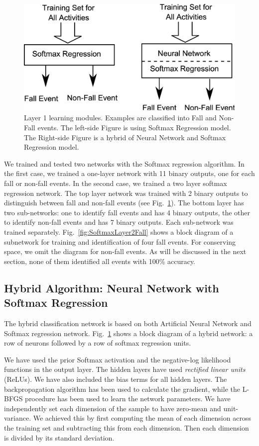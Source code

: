 \documentclass[]{IEEEtran}
\begin{document}
\begin{figure}[t]
	\centering
		\includegraphics[width=0.7\columnwidth]{figures/SoftmaxLayer1.eps}
	\caption{Layer 1 learning modules. Examples are classified into Fall
and Non-Fall events.  The left-side Figure is using Softmax Regression model.
The Right-side Figure is a hybrid of Neural Network and Softmax Regression
model.} \label{fig:SoftmaxLayer1}
\end{figure}

We trained and tested two networks with the Softmax regression algorithm. In
the first case, we trained a one-layer network with 11 binary outputs, one for
each fall or non-fall events. In the second case, we trained a two layer
softmax regression network. The top layer network was trained with 2 binary
outputs to distinguish between fall and non-fall events (see
Fig.~\ref{fig:SoftmaxLayer1}). The bottom layer has two sub-networks:  one to
identify fall events and has 4 binary outputs, the other to identify non-fall
events and has 7 binary outputs. Each sub-network was trained separately.
Fig.~\ref{fig:SoftmaxLayer2Fall} shows a block diagram of a subnetwork for
training and identification of four fall events. For conserving space, we omit
the diagram for non-fall events. As will be discussed in the next section, none
of them identified all events with 100\% accuracy.


\subsection{Hybrid Algorithm: Neural Network with Softmax Regression}
\label{sec:HybridAlgorithmNeuralNetworkAndSoftmaxRegreation}

The hybrid classification network is based on both Artificial Neural Network
and Softmax regression network. Fig.~\ref{fig:SoftmaxLayer1} shows a block
diagram of a hybrid network: a row of neurons followed by a row of softmax
regression units.  \par We have used the prior Softmax activation  and the
negative-log likelihood functions in the output layer. The hidden layers have
used \emph{rectified linear units }(ReLUs).  We have also included the bias
terms for all hidden layers. The backpropagation algorithm\cite{Sarkar1995} has
been used to calculate the gradient, while the L-BFGS procedure has been used
to learn the network parameters. We have independently set each dimension of
the sample to have zero-mean and unit-variance. We achieved this by first
computing the mean of each dimension across the training set and subtracting
this from each dimension. Then each dimension is divided by its standard
deviation.       
\end{document}
